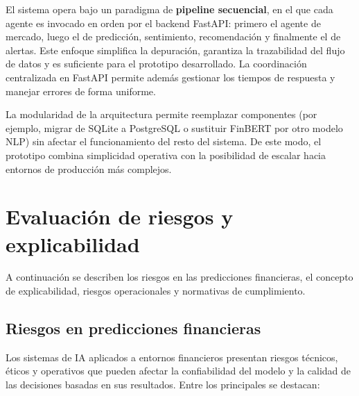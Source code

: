 El sistema opera bajo un paradigma de \textbf{pipeline secuencial}, en el que cada agente es invocado en orden por el backend FastAPI: primero el agente de mercado, luego el de predicción, sentimiento, recomendación y finalmente el de alertas. Este enfoque simplifica la depuración, garantiza la trazabilidad del flujo de datos y es suficiente para el prototipo desarrollado. La coordinación centralizada en FastAPI permite además gestionar los tiempos de respuesta y manejar errores de forma uniforme.

La modularidad de la arquitectura permite reemplazar componentes (por ejemplo, migrar de SQLite a PostgreSQL o sustituir FinBERT por otro modelo NLP) sin afectar el funcionamiento del resto del sistema. De este modo, el prototipo combina simplicidad operativa con la posibilidad de escalar hacia entornos de producción más complejos.

\section{Evaluación de riesgos y explicabilidad}

  A continuación se describen los riesgos en las predicciones financieras, el
  concepto de explicabilidad, riesgos operacionales y normativas de cumplimiento.

  \subsection{Riesgos en predicciones financieras}

  Los sistemas de IA aplicados a entornos financieros presentan riesgos técnicos,
  éticos y operativos que pueden afectar la confiabilidad del modelo y la calidad
  de las decisiones basadas en sus resultados. Entre los principales se destacan:

